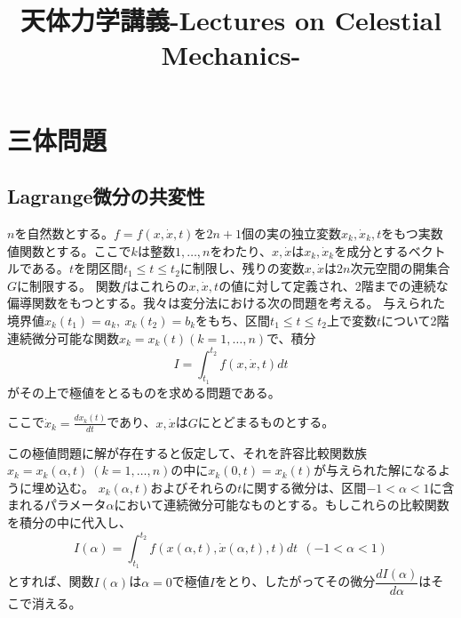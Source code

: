\documentclass[dvipdfmx, leqno]{jsbook}
\title{天体力学講義-Lectures on Celestial Mechanics-}
\author{}
\date{}
\begin{document}
\maketitle
\tableofcontents

\chapter{三体問題}
\section{Lagrange微分の共変性}
    $n$を自然数とする。$f= f(x, \dot{x}, t)$を$2n+ 1$個の実の独立変数$x_k, \dot{x}_k, t$をもつ実数値関数とする。ここで$k$は整数$1, \ldots, n$をわたり、$x, \dot{x}$は$x_k, \dot{x}_k$を成分とするベクトルである。$t$を閉区間$t_1\le t\le t_2$に制限し、残りの変数$x, \dot{x}$は$2n$次元空間の開集合$G$に制限する。
    関数$f$はこれらの$x, \dot{x}, t$の値に対して定義され、2階までの連続な偏導関数をもつとする。我々は変分法における次の問題を考える。
    与えられた境界値$x_k(t_1)= a_k,\ x_k(t_2)= b_k$をもち、区間$t_1\le t\le t_2$上で変数$t$について2階連続微分可能な関数$x_k= x_k(t) (k= 1, \ldots, n)$で、積分
\begin{equation}
    I= \int_{t_1}^{t_2} f(x, \dot{x}, t) dt
\end{equation}
    がその上で極値をとるものを求める問題である。

    ここで$\dot{x}_k= \frac{dx_k(t)}{dt}$であり、$x, \dot{x}$は$G$にとどまるものとする。

    この極値問題に解が存在すると仮定して、それを許容比較関数族$x_k= x_k(\alpha, t)\ (k= 1, \ldots, n)$の中に$x_k(0, t)= x_k(t)$が与えられた解になるように埋め込む。
    $x_k(\alpha, t)$およびそれらの$t$に関する微分は、区間$-1< \alpha< 1$に含まれるパラメータ$\alpha$において連続微分可能なものとする。もしこれらの比較関数を積分の中に代入し、
\begin{equation}
    I(\alpha)= \int_{t_1}^{t_2} f(x(\alpha, t), \dot{x}(\alpha, t), t) dt\ \ (-1< \alpha< 1)
\end{equation}
    とすれば、関数$I(\alpha)$は$\alpha= 0$で極値$I$をとり、したがってその微分$\dfrac{dI(\alpha)}{d\alpha}$はそこで消える。
\end{document}
